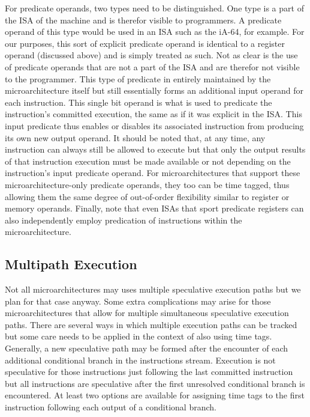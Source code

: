 \documentclass[10pt,dvips]{article}
\begin{document}
For predicate operands, two types need to be distinguished.
One type is a part of the ISA of the machine and
is therefor visible to programmers.
A predicate operand of this type would be
used in an ISA such as the iA-64, for example.
For our purposes, this sort of explicit predicate operand
is identical to a register operand (discussed above) and
is simply treated as such.
Not as clear is the use of predicate operands
that are not a part of the ISA and are therefor not visible
to the programmer.
This type of predicate in entirely maintained by the microarchitecture
itself but still essentially forms an additional input operand
for each instruction.
This single bit operand is what is used to
predicate the instruction's committed execution, the same as
if it was explicit in the ISA.
This input predicate thus enables or disables its associated
instruction from producing its own new output operand.
It should be noted that, at any time, any instruction can
always still be allowed to execute but that only the output results
of that instruction execution must be made available or not depending
on the instruction's input predicate operand.
For microarchitectures that support these microarchitecture-only
predicate operands, they too can be time tagged, thus allowing
them the same degree of out-of-order flexibility similar
to register or memory operands.
Finally, note that even ISAs that sport predicate registers
can also independently employ predication of instructions within the
microarchitecture.
%
%
\subsection{Multipath Execution}
%
Not all microarchitectures may uses multiple speculative
execution paths but we plan for that case anyway.
Some extra complications may arise for those microarchitectures
that allow for multiple simultaneous speculative execution paths.
There are several ways in which multiple
execution paths can be tracked but some care needs to be
applied in the context of also using time tags.
Generally, a new speculative path may be formed
after the encounter of each additional conditional branch
in the instructions stream.  Execution is not speculative
for those instructions just following the last committed
instruction but all instructions are speculative after
the first unresolved conditional branch is encountered.
At least two options are available for assigning time tags
to the first instruction following each output of a conditional
branch.  
\end{document}
